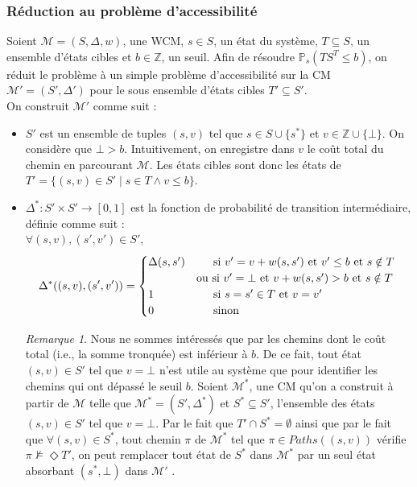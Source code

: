 \documentclass[12pt,a4paper]{report}
\theoremstyle{definition}%
\theoremstyle{remark}
\newtheorem{remark}{Remarque}[chapter]
\newcommand{\ie}{i.e., }
\newcommand{\pr}{\mathbb{P}}
\let\labelitemi\labelitemii
\begin{document}
\subsubsection*{Réduction au problème d'accessibilité}
Soient $\mathcal{M} = (S, \Delta, w)$, une WCM, $s \in S$, un état du système, $T \subseteq S$, un ensemble d'états cibles et $b \in \mathbb{Z}$, un seuil. Afin de résoudre $\pr_s(TS^T \leq b)$, on réduit le problème à un simple problème d'accessibilité sur la CM $\mathcal{M}' = (S', \Delta')$ pour le sous ensemble d'états cibles $T' \subseteq S'$. \\On construit $\mathcal{M'}$ comme suit :
\begin{itemize}
	\renewcommand{\labelitemi}{\tiny$\bullet$}
	\item $S'$ est un ensemble de tuples $(s, v)$ tel que $s \in S \cup \{s^*\}$ et $v \in \mathbb{Z} \cup \{ \bot \}$. On considère que $\bot > b$. Intuitivement, on enregistre dans $v$ le coût total du chemin en parcourant $\mathcal{M}$. Les états cibles sont donc les états de $T' = \{ (s, v) \in S' \; | \; s \in T \wedge v \leq b \}$.
	\item $\Delta^*: S' \times S' \rightarrow [0,1]$ est la fonction de probabilité de transition intermédiaire, définie comme suit :\\
	$\forall (s, v), (s', v') \in S',$
	\[
		\Delta^*((s, v), (s', v')) = 
		\begin{cases}
		\Delta(s, s') & \text{\quad \, si $v' = v + w(s, s')$ et $v' \leq b$  et $s \notin T$ } \\
		 & \text{ou si $v' = \bot$ et $v + w(s, s') > b$  et $s \notin T$} \\
		 1 & \quad \, \text{ si $s = s' \in T$ et $v = v'$} \\
		 0 & \quad \, \text{ sinon}
		\end{cases}
	\]

\begin{remark}
	Nous ne sommes intéressés que par les chemins dont le coût total (\ie la somme tronquée) est inférieur à $b$. De ce fait, tout état $(s, v) \in S'$ tel que $v = \bot$ n'est utile au système que pour identifier les chemins qui ont dépassé le seuil $b$. Soient $\mathcal{M^*}$, une CM qu'on a construit à partir de $\mathcal{M}$ telle que $\mathcal{M^*} = (S', \Delta^*)$ et $S^* \subseteq S'$, l'ensemble des états $(s, v) \in S'$ tel que $v = \bot$. Par le fait que $T' \cap S^* = \emptyset$ ainsi que par le fait que $\forall (s, v) \in S^*$, tout chemin $\pi$ de $\mathcal{M^*}$ tel que $\pi \in Paths((s, v))$ vérifie $\pi \not \models \Diamond T'$, on peut remplacer tout état de $S^*$ dans $\mathcal{M^*}$ par un seul état absorbant $(s^*, \bot)$ dans $\mathcal{M'}$ . \\
\end{remark}


\end{itemize}
\end{document}
